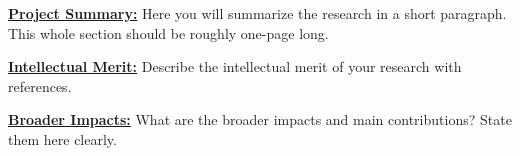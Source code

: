\pagestyle{fancy}
\underline{\textbf{Project Summary:}} Here you will summarize the research in a short paragraph. This whole section should be roughly one-page long. 

\vspace{5mm} %


\lipsum[1]

\vspace{5mm} %

\underline{\textbf{Intellectual Merit:}} Describe the intellectual merit of your research with references. 

\vspace{5mm} %


\lipsum[1]

\vspace{5mm} %

\underline{\textbf{Broader Impacts:}} What are the broader impacts and main contributions? State them here clearly. 

\vspace{5mm} %

\lipsum[1]

\vspace{5mm} %


